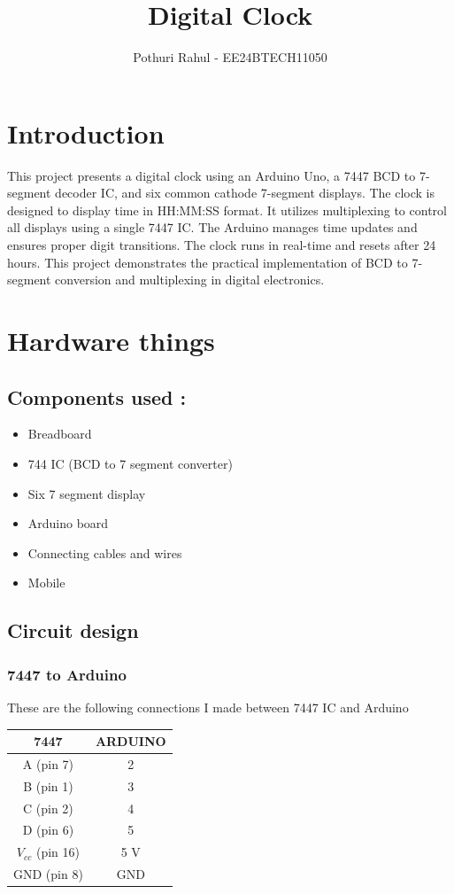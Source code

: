 \documentclass{article}
\title{Digital Clock}
\author{Pothuri Rahul - EE24BTECH11050}
\date{ }
\begin{document}
\maketitle

\section{Introduction}
This project presents a digital clock using an Arduino Uno, a 7447 BCD to 7-segment decoder IC, and six common cathode 7-segment displays. The clock is designed to display time in HH:MM:SS format. It utilizes multiplexing to control all displays using a single 7447 IC. The Arduino manages time updates and ensures proper digit transitions. The clock runs in real-time and resets after 24 hours. This project demonstrates the practical implementation of BCD to 7-segment conversion and multiplexing in digital electronics.


\section{Hardware things}
\subsection{Components used :} 
\begin{itemize}
\item Breadboard
\item 744 IC (BCD to 7 segment converter)
\item Six 7 segment display
\item Arduino board
\item Connecting cables and wires
\item Mobile
\end{itemize}
\subsection{Circuit design} 
\subsubsection{7447 to Arduino}
These are the following connections I made between 7447 IC and Arduino

\begin{center}
    \begin{tabular}{|c|c|}
        \hline
        \textbf{7447} & \textbf{ARDUINO} \\
        \hline
        A (pin 7) & 2 \\
        \hline
        B (pin 1) & 3 \\
        \hline
        C (pin 2) & 4 \\
        \hline
        D (pin 6) & 5 \\
        \hline
        $V_{cc}$ (pin 16) & 5 V \\
        \hline 
        GND (pin 8) & GND \\
        \hline
    \end{tabular}
\end{center}
\end{document}
